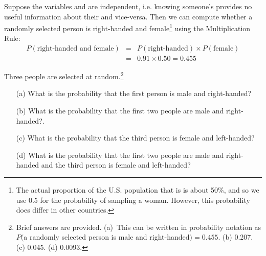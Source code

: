 Suppose the variables  and  are independent, i.e. knowing someone's  provides no useful information about their  and vice-versa. Then we can compute whether a randomly selected person is right-handed and female\footnote{The actual proportion of the U.S. population that is  is about 50\%, and so we use 0.5 for the probability of sampling a woman. However, this probability does differ in other countries.} using the Multiplication Rule:
\begin{eqnarray*}
P(\text{right-handed and female}) &=& P(\text{right-handed}) \times  P(\text{female}) \\
&=& 0.91 \times  0.50 = 0.455
\end{eqnarray*}


\begin{exercise}
Three people are selected at random.\footnote{Brief answers are provided. (a)~This can be written in probability notation as $P($a randomly selected person is male and right-handed$)=0.455$. (b) 0.207. (c) 0.045. (d) 0.0093.} \vspace{-1.5mm}
\begin{enumerate}
\setlength{\itemsep}{0mm}
\item[(a)] What is the probability that the first person is male and right-handed?
\item[(b)] What is the probability that the first two people are male and right-handed?.
\item[(c)] What is the probability that the third person is female and left-handed?
\item[(d)] What is the probability that the first two people are male and right-handed and the third person is female and left-handed?
\end{enumerate}
\end{exercise}

